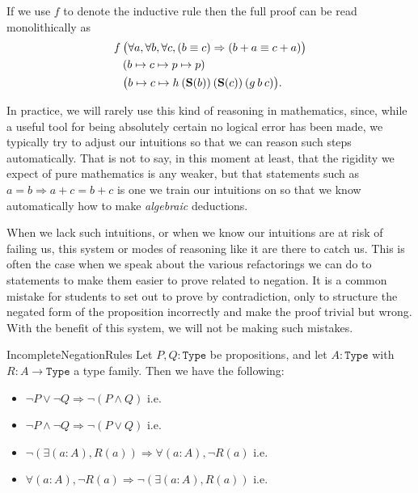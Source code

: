 \documentclass[11pt]{article}
\begin{document}
\begin{corollary}
If we use $f$ to denote the inductive rule then the full proof can be read monolithically as \begin{align*}
f \hspace{0.2em}
& \big( \forall a, \forall b, \forall c, (b \equiv c) \Rightarrow (b + a \equiv c + a) \big) \\
& (b \mapsto c \mapsto p \mapsto p) \\
& \big(b \mapsto c \mapsto h \hspace{0.2em} (\mathbf{S}(b)) \hspace{0.2em} (\mathbf{S}(c)) \hspace{0.2em} (g \hspace{0.2em} b \hspace{0.2em} c)\big).
\end{align*}
\end{corollary}

In practice, we will rarely use this kind of reasoning in mathematics, since, while a useful tool for being absolutely certain no logical error has been made, we typically try to adjust our intuitions so that we can reason such steps automatically. That is not to say, in this moment at least, that the rigidity we expect of pure mathematics is any weaker, but that statements such as $a = b \Rightarrow a + c = b + c$ is one we train our intuitions on so that we know automatically how to make \emph{algebraic} deductions.

When we lack such intuitions, or when we know our intuitions are at risk of failing us, this system or modes of reasoning like it are there to catch us. This is often the case when we speak about the various refactorings we can do to statements to make them easier to prove related to negation. It is a common mistake for students to set out to prove by contradiction, only to structure the negated form of the proposition incorrectly and make the proof trivial but wrong. With the benefit of this system, we will not be making such mistakes.

\begin{label theorem}{IncompleteNegationRules}
Let $P,Q \colon \mathtt{Type}$ be propositions, and let $A \colon \mathtt{Type}$ with $R\colon A \to \mathtt{Type}$ a type family. Then we have the following:\begin{itemize}
\item $\neg P \vee \neg Q \Rightarrow \neg (P \wedge Q)$ i.e. 
\item $\neg P \wedge \neg Q \Rightarrow \neg (P \vee Q)$ i.e. 
\item $\neg (\exists (a \colon A), R(a)) \Rightarrow \forall (a \colon A), \neg R(a)$ i.e. 
\item $\forall (a \colon A), \neg R(a) \Rightarrow \neg (\exists (a \colon A), R(a))$ i.e. 
\end{itemize}
\end{label theorem}
\end{document}
